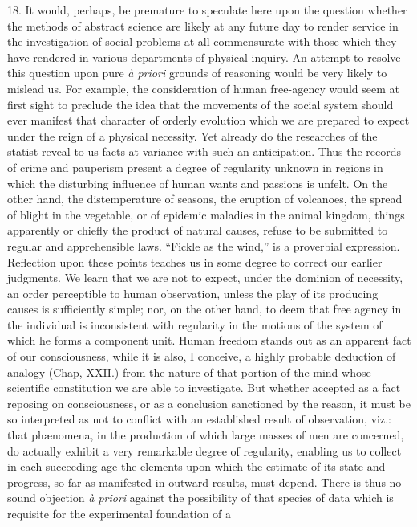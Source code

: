 \documentclass[oneside]{book}
\begin{document}
18. It would, perhaps, be premature to speculate here upon
the question whether the methods of abstract science are likely at
any future day to render service in the investigation of social
problems at all commensurate with those which they have rendered
in various departments of physical inquiry. An attempt
to resolve this question upon pure \textit{\`{a} priori} grounds of reasoning
would be very likely to mislead us. For example, the consideration
of human free-agency would seem at first sight to preclude
the idea that the movements of the social system should ever manifest
that character of orderly evolution which we are prepared
to expect under the reign of a physical necessity. Yet already
do the researches of the statist reveal to us facts at variance with
such an anticipation. Thus the records of crime and pauperism
present a degree of regularity unknown in regions in which the
disturbing influence of human wants and passions is unfelt. On
the other hand, the distemperature of seasons, the eruption of
volcanoes, the spread of blight in the vegetable, or of epidemic
maladies in the animal kingdom, things apparently or chiefly the
product of natural causes, refuse to be submitted to regular and
apprehensible laws. ``Fickle as the wind,'' is a proverbial expression.
Reflection upon these points teaches us in some degree
to correct our earlier judgments. We learn that we are not to
expect, under the dominion of necessity, an order perceptible to
human observation, unless the play of its producing causes is
sufficiently simple; nor, on the other hand, to deem that free
agency in the individual is inconsistent with regularity in the
motions of the system of which he forms a component unit.
Human freedom stands out as an apparent fact of our consciousness,
while it is also, I conceive, a highly probable deduction of
analogy (Chap, XXII.) from the nature of that portion of the
mind whose scientific constitution we are able to investigate.
But whether accepted as a fact reposing on consciousness, or as
a conclusion sanctioned by the reason, it must be so interpreted
as not to conflict with an established result of observation, viz.:
that ph\ae{}nomena, in the production of which large masses of men
are concerned, do actually exhibit a very remarkable degree of
regularity, enabling us to collect in each succeeding age the elements
upon which the estimate of its state and progress, so far
as manifested in outward results, must depend. There is thus no
sound objection \textit{\`{a} priori} against the possibility of that species of
data which is requisite for the experimental foundation of a
\end{document}
